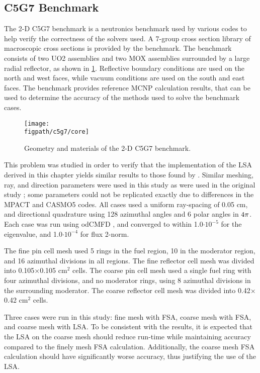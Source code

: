 {{    \subsection{C5G7 Benchmark}{\label{ssec:LSMOC:C5G7 Benchmark}
      The 2-D C5G7 benchmark \cite{Smith2006} is a neutronics benchmark used by various codes to help verify the correctness of the solvers used.
      A 7-group cross section library of macroscopic cross sections is provided by the benchmark.
      The benchmark consists of two \ac{UO2} assemblies and two \ac{MOX} assemblies surrounded by a large radial reflector, as shown in \cref{fig:LSMOC:C5G7:CoreGeom}.
      Reflective boundary conditions are used on the north and west faces, while vacuum conditions are used on the south and east faces.
      The benchmark provides reference MCNP calculation results, that can be used to determine the accuracy of the methods used to solve the benchmark cases.

      \begin{figure}[htbp]
        \centering
        \texttt{[image: \\figpath/c5g7/core]}
        \caption{Geometry and materials of the 2-D C5G7 benchmark. \label{fig:LSMOC:C5G7:CoreGeom}}
      \end{figure}

      This problem was studied in order to verify that the implementation of the \ac{LSA} derived in this chapter yields similar results to those found by \citet{Ferrer2016}.
      Similar meshing, ray, and direction parameters were used in this study as were used in the original study \cite{Ferrer2016}; some parameters could not be replicated exactly due to differences in the MPACT and CASMO5 codes.
      All cases used a uniform ray-spacing of 0.05 cm, and directional quadrature using 128 azimuthal angles and 6 polar angles in $4\pi$.
      Each case was run using od\ac{CMFD} \cite{Zhu2016}, and converged to within 1.0$\cdot 10^{-5}$ for the eigenvalue, and 1.0$\cdot 10^{-4}$ for flux 2-norm.

      The fine pin cell mesh used 5 rings in the fuel region, 10 in the moderator region, and 16 azimuthal divisions in all regions.
      The fine reflector cell mesh was divided into 0.105$\times$0.105 cm$^2$ cells.
      The coarse pin cell mesh used a single fuel ring with four azimuthal divisions, and no moderator rings, using 8 azimuthal divisions in the surrounding moderator.
      The coarse reflector cell mesh was divided into 0.42$\times$0.42 cm$^2$ cells.

      Three cases were run in this study: fine mesh with \ac{FSA}, coarse mesh with \ac{FSA}, and coarse mesh with \ac{LSA}.
      To be consistent with the \citet{Ferrer2016} results, it is expected that the \ac{LSA} on the coarse mesh should reduce run-time while maintaining accuracy compared to the finely mesh \ac{FSA} calculation.
      Additionally, the coarse mesh \ac{FSA} calculation should have significantly worse accuracy, thus justifying the use of the \ac{LSA}.

}}}
